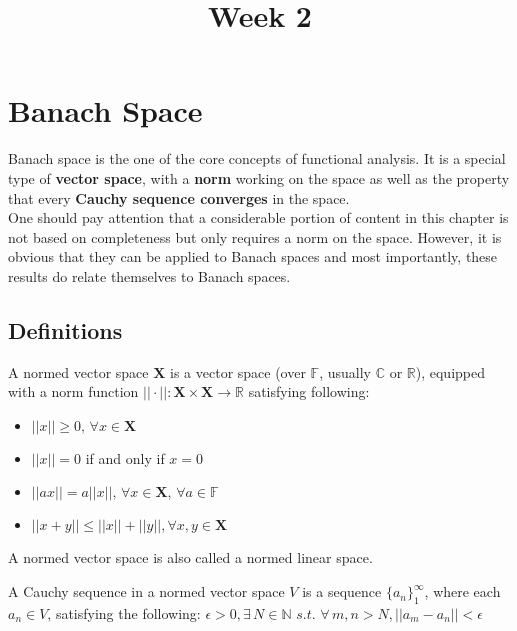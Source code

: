 \documentclass{article}
\title{Week 2}
\begin{document}
\maketitle


\section{Banach Space}\label{banach space def}%


Banach space is the one of the core concepts of functional analysis.  It is a special type of {\bf vector space}, with a {\bf norm} working on the space as well as the property that every {\bf Cauchy sequence converges} in the space.\\
One should pay attention that a considerable portion of content in this chapter is not based on completeness but only requires a norm on the space. However, it is obvious that they can be applied to Banach spaces and most importantly, these results do relate themselves to Banach spaces.


\subsection{Definitions}

\begin{definition}\rm\label{definition of norm}\nextline
	A normed vector space $\mathbf{X}$ is a vector space (over $\mathbb{F}$, usually $\mathbb{C}$ or $\mathbb{R}$), equipped with a norm function $|| \cdot||:\mathbf{X}\times \mathbf{X}\xrightarrow{}{\mathbb{R}}$ satisfying following:

	\begin{itemize}
		\item $||x||\geq0,\,\forall x\in\mathbf{X}$
		\item $||x||=0$ if and only if $x=0$
		\item $||ax||=a||x||,\, \forall x\in\mathbf{X},\, \forall a\in\mathbb{F}$
		\item $||x+y||\leq||x||+||y||,\forall x,y\in\mathbf{X}$
	\end{itemize}
	A normed vector  space is also called a normed linear space.
\end{definition}


\begin{definition}\rm\nextline
	\label{Cauchy Sequence}
	A Cauchy sequence in a normed vector space $V$ is a sequence $\{a_n\}_1^\infty$, where each $a_n\in V$, satisfying the following:
	$\epsilon>0,\exists\, N\in\mathbb{N}\,\,s.t.\,\,
		\forall\, m,n>N, ||a_m-a_n||<\epsilon$

\end{definition}
\end{document}
